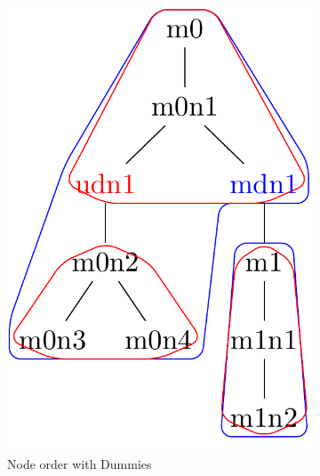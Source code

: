 \documentclass{article}
\begin{document}
\begin{figure}[H]
\begin{subfigure}{3cm}
		\includegraphics[scale=0.2]{F3C2Tree}
		\caption{Node order with Dummies}
		\label{factory:subim2}
	\end{subfigure}
	\begin{subfigure}{2.5cm}

\end{subfigure}
\end{figure}
\end{document}

